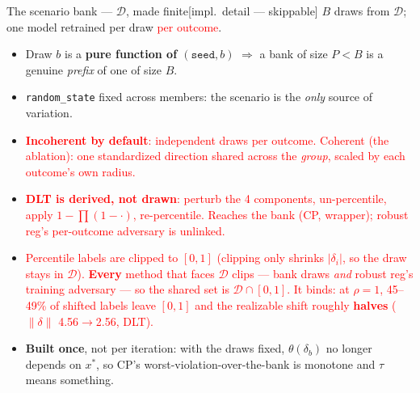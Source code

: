 \documentclass{beamer}
\newcommand{\implnote}{\hfill{\normalfont\scriptsize\color{gray}[impl.\ detail --- skippable]}}
\newcommand{\mc}[1]{\textcolor{red}{#1}}
\begin{document}
\begin{frame}{The scenario bank --- $\mathcal D$, made finite\implnote}
  \small
  $B$ draws from $\mathcal D$; one model retrained per draw \mc{per outcome}.
  \begin{itemize}
    \item Draw $b$ is a \textbf{pure function of $(\texttt{seed},b)$}
      $\Rightarrow$ a bank of size $P<B$ is a genuine \emph{prefix} of one of size $B$.
    \item \texttt{random\_state} fixed across members: the scenario is the
      \emph{only} source of variation.
    \item \mc{\textbf{Incoherent by default}: independent draws per outcome.
      Coherent (the ablation): one standardized direction shared across the
      \emph{group}, scaled by each outcome's own radius.}
    \item \mc{\textbf{DLT is derived, not drawn}: perturb the 4 components,
      un-percentile, apply $1-\prod(1-\cdot)$, re-percentile. Reaches the bank
      (CP, wrapper); robust reg's per-outcome adversary is unlinked.}
    \item \mc{Percentile labels are clipped to $[0,1]$ (clipping only shrinks
      $|\delta_i|$, so the draw stays in $\mathcal D$). \textbf{Every} method that
      faces $\mathcal D$ clips --- bank draws \emph{and} robust reg's training
      adversary --- so the shared set is $\mathcal D\cap[0,1]$. It binds: at
      $\rho{=}1$, 45--49\% of shifted labels leave $[0,1]$ and the realizable
      shift roughly \textbf{halves} ($\lVert\delta\rVert$ 4.56$\to$2.56, DLT).}
    \item \textbf{Built once}, not per iteration: with the draws fixed,
      $\theta(\delta_b)$ no longer depends on $x^\ast$, so CP's
      worst-violation-over-the-bank is monotone and $\tau$ means something.
  \end{itemize}
\end{frame}
\end{document}
